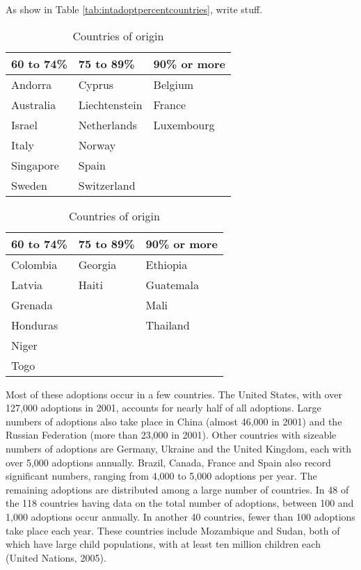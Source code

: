 As show in Table \ref{tab:intadoptpercentcountries}, write stuff.

\begin{table}[ht!]
    \begin{subtable}[h]{0.45\textwidth}
        \centering
        \begin{tabular}{l l l}
        60 to 74\% & 75 to 89\% & 90\% or more\\
        \hline
        Andorra & Cyprus & Belgium\\
        Australia & Liechtenstein & France\\
        Israel & Netherlands & Luxembourg\\
        Italy & Norway & \\
        Singapore & Spain & \\
        Sweden & Switzerland & \\
        \end{tabular}
        \caption{Receiving Countries}
        \label{tab:receivingcountries}
    \end{subtable}
    \hfill
    \begin{subtable}[h]{0.45\textwidth}
        \centering
        \begin{tabular}{l l l}
        60 to 74\% & 75 to 89\% & 90\% or more\\
        \hline
        Colombia & Georgia & Ethiopia\\
        Latvia & Haiti & Guatemala\\
        Grenada &  & Mali\\
        Honduras &  & Thailand\\
        Niger &  & \\
        Togo &  & \\
        \end{tabular}
        \caption{Countries of origin}
        \label{tab:countriesoforigin}
    \end{subtable}
    \label{tab:intadoptcountries}
\end{table}


Most of these adoptions occur in a few countries. The United States, with over 127,000 adoptions in 2001, accounts for nearly half of all adoptions. Large numbers of adoptions also take place in China (almost 46,000 in 2001) and the Russian Federation (more than 23,000 in 2001). Other countries with sizeable numbers of adoptions are Germany, Ukraine and the United Kingdom, each with over 5,000 adoptions annually. Brazil, Canada, France and Spain also record significant numbers, ranging from 4,000 to 5,000 adoptions per year\cite{unreport}.
The remaining adoptions are distributed among a large number of countries. In 48 of the 118 countries having data on the total number of adoptions, between 100 and 1,000 adoptions occur annually. In another 40 countries, fewer than 100 adoptions take place each year. These countries include Mozambique and Sudan, both of which have large child populations, with at least ten million children each (United Nations, 2005)\cite{unreport}.

